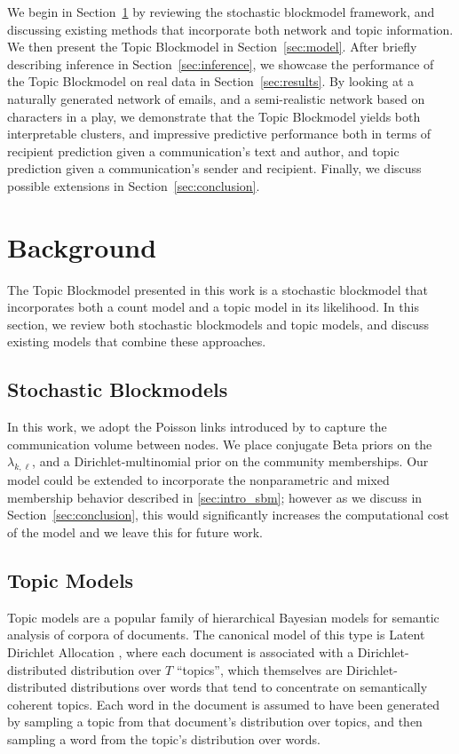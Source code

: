     We begin in Section~\ref{sec:background} by reviewing the stochastic blockmodel framework, and discussing existing methods that incorporate both network and topic information. We then present the Topic Blockmodel in Section~\ref{sec:model}. After briefly describing inference in Section~\ref{sec:inference}, we showcase the performance
    of the Topic Blockmodel on real data in Section~\ref{sec:results}. By looking at a naturally generated network of emails, and a semi-realistic network based on characters in a play, we demonstrate that the Topic Blockmodel yields both interpretable clusters, and impressive predictive performance  both in terms of recipient prediction given a communication's text and author, and topic prediction given a communication's sender and recipient. Finally, we discuss possible extensions in Section~\ref{sec:conclusion}.

\section{Background}\label{sec:background}

    The Topic Blockmodel presented in this work is a stochastic blockmodel that incorporates both a count model and a topic model in its likelihood. In this section, we review both stochastic blockmodels and topic models, and discuss existing models that combine these approaches.
    
    \subsection{Stochastic Blockmodels}
    

        In this work, we adopt the Poisson links introduced by \citep{Karrer:Newman:2011} to capture the communication volume between nodes.  We place conjugate Beta priors on the $\lambda_{k,\ell}$, and a Dirichlet-multinomial prior on the community memberships. Our model could be extended to incorporate the nonparametric and mixed membership behavior described in \ref{sec:intro_sbm}; however as we discuss in Section~\ref{sec:conclusion}, this would significantly increases the computational cost of the model and we leave this for future work. 
    
    \subsection{Topic Models}
    
        Topic models are a popular family of hierarchical Bayesian models for semantic analysis of corpora of documents.  The canonical model of this type is Latent Dirichlet Allocation \cite{blei2003LDA}, where each document is associated with a Dirichlet-distributed distribution over $T$ ``topics'', which themselves are Dirichlet-distributed distributions over words that tend to concentrate on semantically coherent topics. Each word  in the  document is assumed to have been generated by sampling a topic from that document's distribution over topics, and then sampling a word from the topic's distribution over words. 
        
